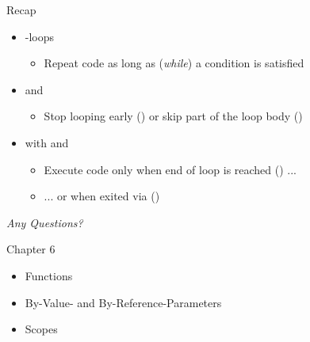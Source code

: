 
\begin{frame}[t,plain]
\titlepage
\end{frame}


\begin{frame}{Recap}
%
\begin{itemize}
\item {}-loops
	\begin{itemize}
	\item Repeat code as long as (\emph{while}) a condition is satisfied
	\end{itemize}
\item {} and 
	\begin{itemize}
	\item Stop looping early () or skip part of the loop body ()
	\end{itemize}
\item {} with  and 
	\begin{itemize}
	\item Execute code only when end of loop is reached () ...
	\item ... or when exited via  ()
	\end{itemize}
\end{itemize}
%
\begin{center}
	\emph{Any Questions?}
\end{center}
%
\end{frame}


\begin{frame}[fragile]{Chapter 6}
%
\begin{itemize}
\item Functions
\item By-Value- and By-Reference-Parameters
\item Scopes
\end{itemize}
%
\end{frame}


